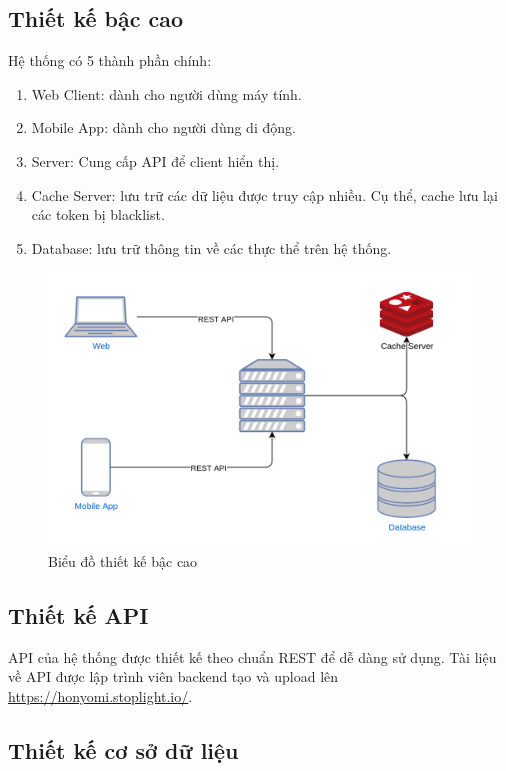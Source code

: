 \documentclass[./../main.tex]{subfiles}
\begin{document}
\subsection{Thiết kế bậc cao}

Hệ thống có 5 thành phần chính:
\begin{enumerate}
	\item Web Client: dành cho người dùng máy tính.
	\item Mobile App: dành cho người dùng di động.
	\item Server: Cung cấp API để client hiển thị.
	\item Cache Server: lưu trữ các dữ liệu được truy cập nhiều. Cụ thể, cache lưu lại các token bị blacklist.
	\item Database: lưu trữ thông tin về các thực thể trên hệ thống.
\end{enumerate}

\begin{figure}[H]
	\centering
	\includegraphics[width=\linewidth]{./images/high_level_diagram.png}
	\caption{Biểu đồ thiết kế bậc cao}
\end{figure}

\subsection{Thiết kế API}

API của hệ thống được thiết kế theo chuẩn REST để dễ dàng sử dụng. Tài liệu về API được lập trình viên backend tạo và upload lên \url{https://honyomi.stoplight.io/}.

\subsection{Thiết kế cơ sở dữ liệu}
\end{document}
